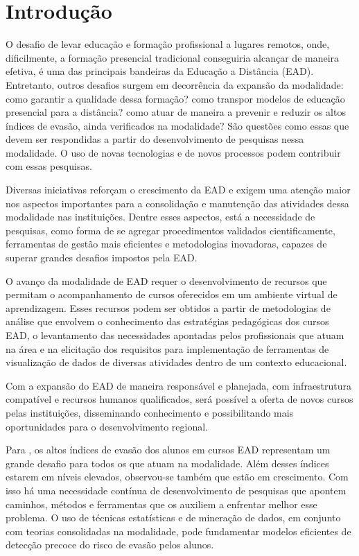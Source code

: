 \chapter{Introdução}

O desafio de levar educação e formação profissional a lugares remotos, onde,
dificilmente, a formação presencial tradicional conseguiria alcançar de maneira
efetiva, é uma das principais bandeiras da Educação a Distância (EAD).
Entretanto, outros desafios surgem em decorrência da expansão da modalidade:
como garantir a qualidade dessa formação? como transpor modelos de educação
presencial para a distância? como atuar de maneira a prevenir e reduzir os altos
índices de evasão, ainda verificados na modalidade? São questões como essas que
devem ser respondidas a partir do desenvolvimento de pesquisas nessa modalidade.
O uso de novas tecnologias e de novos processos podem contribuir com essas
pesquisas.

Diversas iniciativas reforçam o crescimento da EAD e exigem uma atenção maior
nos aspectos importantes para a consolidação e manutenção das atividades dessa
modalidade nas instituições. Dentre esses aspectos, está a necessidade de
pesquisas, como forma de se agregar procedimentos validados cientificamente,
ferramentas de gestão mais eficientes e metodologias inovadoras, capazes de
superar grandes desafios impostos pela EAD.

O avanço da modalidade de EAD requer o desenvolvimento de recursos que permitam
o acompanhamento de cursos oferecidos em um ambiente virtual de aprendizagem.
Esses recursos podem ser obtidos a partir de metodologias de análise que
envolvem o conhecimento das estratégias pedagógicas dos cursos EAD, o
levantamento das necessidades apontadas pelos profissionais que atuam na área e
na elicitação dos requisitos para implementação de ferramentas de visualização
de dados de diversas atividades dentro de um contexto educacional.
\cite{ramos2016abordagem}

Com a expansão do EAD de maneira responsável e planejada, com infraestrutura
compatível e recursos humanos qualificados, será possível a oferta de novos
cursos pelas instituições, disseminando conhecimento e possibilitando mais
oportunidades para o desenvolvimento regional.

Para , os altos índices de evasão dos alunos em
cursos EAD representam um grande desafio para todos os que atuam na modalidade.
Além desses índices estarem em níveis elevados, observou-se também que estão em
crescimento. Com isso há uma necessidade contínua de desenvolvimento de
pesquisas que apontem caminhos, métodos e ferramentas que os auxiliem a
enfrentar melhor esse problema. O uso de técnicas estatísticas e de mineração de
dados, em conjunto com teorias consolidadas na modalidade, pode fundamentar
modelos eficientes de detecção precoce do risco de evasão pelos alunos.

